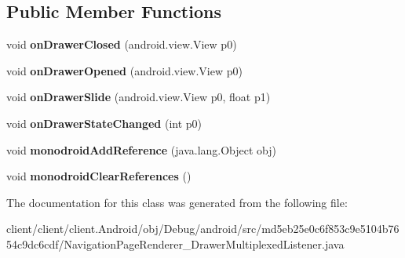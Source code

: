 \subsection*{Public Member Functions}
\begin{DoxyCompactItemize}
\item 
\hypertarget{classmd5eb25e0c6f853c9e5104b7654c9dc6cdf_1_1NavigationPageRenderer__DrawerMultiplexedListener_aac33c787cba55d489e41ec9495f9f756}{}void {\bfseries on\+Drawer\+Closed} (android.\+view.\+View p0)\label{classmd5eb25e0c6f853c9e5104b7654c9dc6cdf_1_1NavigationPageRenderer__DrawerMultiplexedListener_aac33c787cba55d489e41ec9495f9f756}

\item 
\hypertarget{classmd5eb25e0c6f853c9e5104b7654c9dc6cdf_1_1NavigationPageRenderer__DrawerMultiplexedListener_aa562e62480284cc3ee9137fbdc7a5280}{}void {\bfseries on\+Drawer\+Opened} (android.\+view.\+View p0)\label{classmd5eb25e0c6f853c9e5104b7654c9dc6cdf_1_1NavigationPageRenderer__DrawerMultiplexedListener_aa562e62480284cc3ee9137fbdc7a5280}

\item 
\hypertarget{classmd5eb25e0c6f853c9e5104b7654c9dc6cdf_1_1NavigationPageRenderer__DrawerMultiplexedListener_a6d120b7a71d5b2c4c021631b78fc3746}{}void {\bfseries on\+Drawer\+Slide} (android.\+view.\+View p0, float p1)\label{classmd5eb25e0c6f853c9e5104b7654c9dc6cdf_1_1NavigationPageRenderer__DrawerMultiplexedListener_a6d120b7a71d5b2c4c021631b78fc3746}

\item 
\hypertarget{classmd5eb25e0c6f853c9e5104b7654c9dc6cdf_1_1NavigationPageRenderer__DrawerMultiplexedListener_a56ca796515b99f5633d4afc323bd082c}{}void {\bfseries on\+Drawer\+State\+Changed} (int p0)\label{classmd5eb25e0c6f853c9e5104b7654c9dc6cdf_1_1NavigationPageRenderer__DrawerMultiplexedListener_a56ca796515b99f5633d4afc323bd082c}

\item 
\hypertarget{classmd5eb25e0c6f853c9e5104b7654c9dc6cdf_1_1NavigationPageRenderer__DrawerMultiplexedListener_ac9e2c2965e7def87bdd46e12aaac40d0}{}void {\bfseries monodroid\+Add\+Reference} (java.\+lang.\+Object obj)\label{classmd5eb25e0c6f853c9e5104b7654c9dc6cdf_1_1NavigationPageRenderer__DrawerMultiplexedListener_ac9e2c2965e7def87bdd46e12aaac40d0}

\item 
\hypertarget{classmd5eb25e0c6f853c9e5104b7654c9dc6cdf_1_1NavigationPageRenderer__DrawerMultiplexedListener_aac2ec67f2b999bd09c21b34fef363828}{}void {\bfseries monodroid\+Clear\+References} ()\label{classmd5eb25e0c6f853c9e5104b7654c9dc6cdf_1_1NavigationPageRenderer__DrawerMultiplexedListener_aac2ec67f2b999bd09c21b34fef363828}

\end{DoxyCompactItemize}


The documentation for this class was generated from the following file\+:\begin{DoxyCompactItemize}
\item 
client/client/client.\+Android/obj/\+Debug/android/src/md5eb25e0c6f853c9e5104b7654c9dc6cdf/Navigation\+Page\+Renderer\+\_\+\+Drawer\+Multiplexed\+Listener.\+java\end{DoxyCompactItemize}
